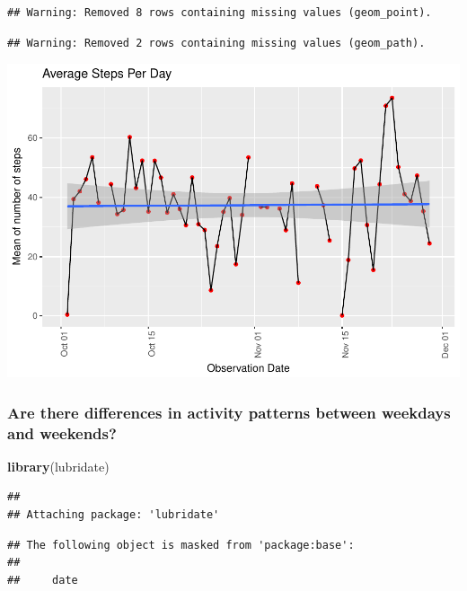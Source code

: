 \documentclass[]{article}
\newenvironment{Shaded}{\begin{snugshade}}{\end{snugshade}}
\newcommand{\KeywordTok}[1]{\textcolor[rgb]{0.13,0.29,0.53}{\textbf{#1}}}
\newcommand{\NormalTok}[1]{#1}
\begin{document}
\begin{verbatim}
## Warning: Removed 8 rows containing missing values (geom_point).
\end{verbatim}

\begin{verbatim}
## Warning: Removed 2 rows containing missing values (geom_path).
\end{verbatim}

\includegraphics{PA1_template_files/figure-latex/unnamed-chunk-9-1.pdf}

\subsubsection{Are there differences in activity patterns between
weekdays and
weekends?}\label{are-there-differences-in-activity-patterns-between-weekdays-and-weekends}

\begin{Shaded}
\begin{Highlighting}[]
\KeywordTok{library}\NormalTok{(lubridate)}
\end{Highlighting}
\end{Shaded}

\begin{verbatim}
## 
## Attaching package: 'lubridate'
\end{verbatim}

\begin{verbatim}
## The following object is masked from 'package:base':
## 
##     date
\end{verbatim}
\end{document}
